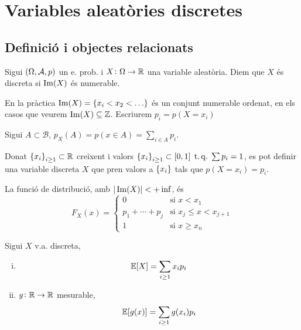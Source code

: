 \chapter{Variables aleatòries discretes}

\section[Definició i objectes relacionats]
    {Definició i objectes relacionats
    }

\begin{defi}
    Sigui $\left( \Omega, \mathcal{A}, p\right)$ un e. prob. i $X\colon \Omega\to\mathbb{R}$ una variable aleatòria. Diem que $X$ és discreta si
    $\operatorname{Im}(X)$ és numerable.
\end{defi}

\begin{obs}
    En la pràctica $\im(X) = \lc x_i < x_2 < \dots \rc$ és un conjunt numerable ordenat, en els casos que veurem $\operatorname{Im}(X)\subseteq\mathbb{Z}$.
    Escriurem $p_i = p(X=x_i)$
\end{obs}

\begin{obs}
    Sigui $A\subset\mathcal{B}$, $p_X(A) = p(x\in A) = \sum_{i\in A}{p_i}$.
\end{obs}

\begin{obs}
    Donat $\left\{ x_i \right\}_{i \ge 1} \subset\mathbb{R}$ creixent i valors $\left\{ x_i \right\}_{i \ge 1} \subset [0,1] \operatorname{\;t.q.\;} \sum{p_i}=1$, es pot definir
    una variable discreta $X$ que pren valors a $\left\{ x_i \right\}$ tals que $p(X=x_i) = p_i$.
\end{obs}

\begin{obs}
    La funció de distribució, amb $|\operatorname{Im}(X)|<+\inf$, és
    \[F_X(x) = \begin{cases}
        0 &\text{si } x<x_1\\
        p_1+\cdots+p_j &\text{si } x_j \le x < x_{j+1}\\
        1 &\text{si } x \ge x_n
    \end{cases}\]
\end{obs}

\begin{prop} Sigui $X$ v.a. discreta,
    \begin{enumerate}[i)]
        \item \[\operatorname{\mathbb{E}}[X] = \sum_{i \ge 1}{x_i p_i}\]
        \item $g\colon \mathbb{R}\to\mathbb{R}$ mesurable, \[\operatorname{\mathbb{E}}[g(x)] = \sum_{i \ge 1}{g(x_i) p_i}\]
    \end{enumerate}
\end{prop}


